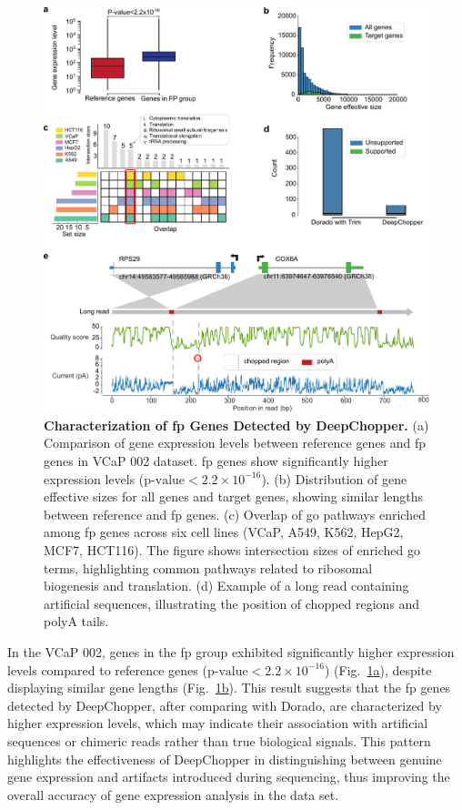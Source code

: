 \documentclass[pdflatex, sn-mathphys-num, lineno]{sn-jnl}%
\newcommand{\figref}[2]{Fig.~\hyperref[#1]{\ref*{#1}#2}}
\theoremstyle{thmstyleone}%
\theoremstyle{thmstyletwo}%
\theoremstyle{thmstylethree}%
\begin{document}
\begin{figure}[!h]
	\includegraphics[height=1\columnwidth]{finals/figure2}
	\caption{{\bf Characterization of \gls{fp} Genes Detected by DeepChopper.} (a) Comparison of gene expression levels between reference genes and \gls{fp} genes in VCaP 002 dataset. \gls{fp} genes show significantly higher expression levels (\(\textrm{p-value} < 2.2 \times 10^{-16}\)). (b) Distribution of gene effective sizes for all genes and target genes, showing similar lengths between reference and \gls{fp} genes. (c) Overlap of \gls{go} pathways enriched among \gls{fp} genes across six cell lines (VCaP, A549, K562, HepG2, MCF7, HCT116). The figure shows intersection sizes of enriched \gls{go} terms, highlighting common pathways related to ribosomal biogenesis and translation. (d) Example of a long read containing artificial sequences, illustrating the position of chopped regions and polyA tails.}\label{fig:f2}
\end{figure}

In the VCaP 002, genes in the \gls{fp} group exhibited significantly higher expression levels compared to reference genes (\(\textrm{p-value} < 2.2 \times 10^{-16}\)) (\figref{fig:f2}{a}), despite displaying similar gene lengths (\figref{fig:f2}{b}).
This result suggests that the \gls{fp} genes detected by DeepChopper, after comparing with Dorado, are characterized by higher expression levels, which may indicate their association with artificial sequences or chimeric reads rather than true biological signals.
This pattern highlights the effectiveness of DeepChopper in distinguishing between genuine gene expression and artifacts introduced during sequencing, thus improving the overall accuracy of gene expression analysis in the data set.
\end{document}
